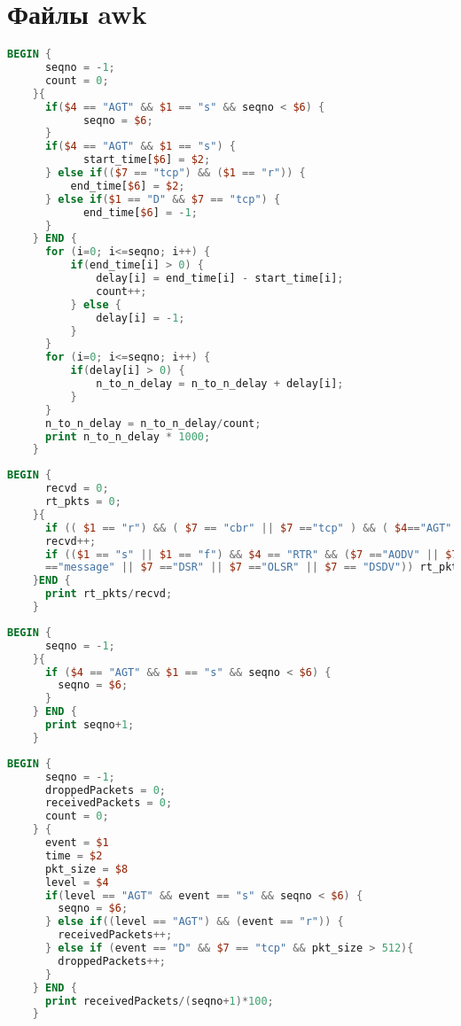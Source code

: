 \chapter{Файлы awk}

\hypertarget{ap_awk}{}

\begin{lstlisting}[language=awk, style=mystyle, caption=AWK скрипт для подсчёта параметра delay]
    BEGIN {
      seqno = -1;    
      count = 0;
    }{
      if($4 == "AGT" && $1 == "s" && seqno < $6) {
            seqno = $6;
      } 
      if($4 == "AGT" && $1 == "s") {
            start_time[$6] = $2;
      } else if(($7 == "tcp") && ($1 == "r")) {
          end_time[$6] = $2;
      } else if($1 == "D" && $7 == "tcp") {
            end_time[$6] = -1;
      } 
    } END {        
      for (i=0; i<=seqno; i++) {
          if(end_time[i] > 0) {
              delay[i] = end_time[i] - start_time[i];
              count++;
          } else {
              delay[i] = -1;
          }
      }
      for (i=0; i<=seqno; i++) {
          if(delay[i] > 0) {
              n_to_n_delay = n_to_n_delay + delay[i];
          }         
      }
      n_to_n_delay = n_to_n_delay/count;
      print n_to_n_delay * 1000;
    }
    \end{lstlisting}
    
    \begin{lstlisting}[language=awk, style=mystyle, caption=AWK скрипт для подсчёта параметра NRL]
    BEGIN {
      recvd = 0;
      rt_pkts = 0;
    }{
      if (( $1 == "r") && ( $7 == "cbr" || $7 =="tcp" ) && ( $4=="AGT" ))
      recvd++;
      if (($1 == "s" || $1 == "f") && $4 == "RTR" && ($7 =="AODV" || $7 
      =="message" || $7 =="DSR" || $7 =="OLSR" || $7 == "DSDV")) rt_pkts++;
    }END {
      print rt_pkts/recvd;
    }
    \end{lstlisting}
    
    \begin{lstlisting}[language=awk, style=mystyle, caption=AWK скрипт для подсчёта параметра Packets sent]
      BEGIN {
      seqno = -1;    
    }{
      if ($4 == "AGT" && $1 == "s" && seqno < $6) {
        seqno = $6;
      }
    } END {
      print seqno+1;
    } 
    \end{lstlisting}
    
    \begin{lstlisting}[language=awk, style=mystyle, caption=AWK скрипт для подсчёта параметра PDR]
    BEGIN {
      seqno = -1; 
      droppedPackets = 0;
      receivedPackets = 0;
      count = 0;
    } {
      event = $1
      time = $2
      pkt_size = $8
      level = $4
      if(level == "AGT" && event == "s" && seqno < $6) {
        seqno = $6;
      } else if((level == "AGT") && (event == "r")) {
        receivedPackets++;
      } else if (event == "D" && $7 == "tcp" && pkt_size > 512){
        droppedPackets++; 
      }
    } END { 
      print receivedPackets/(seqno+1)*100;
    }
    \end{lstlisting}
    
